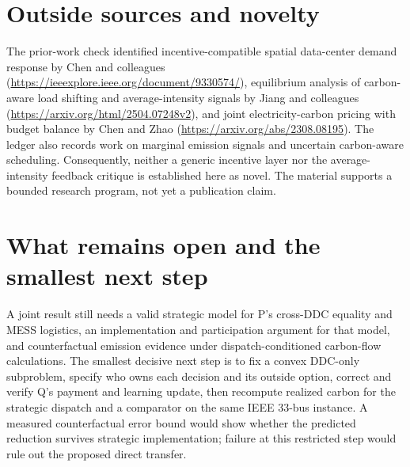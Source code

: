 \documentclass{article}
\begin{document}
\section*{Outside sources and novelty}

The prior-work check identified incentive-compatible spatial data-center demand response by Chen and colleagues (\url{https://ieeexplore.ieee.org/document/9330574/}), equilibrium analysis of carbon-aware load shifting and average-intensity signals by Jiang and colleagues (\url{https://arxiv.org/html/2504.07248v2}), and joint electricity-carbon pricing with budget balance by Chen and Zhao (\url{https://arxiv.org/abs/2308.08195}). The ledger also records work on marginal emission signals and uncertain carbon-aware scheduling. Consequently, neither a generic incentive layer nor the average-intensity feedback critique is established here as novel. The material supports a bounded research program, not yet a publication claim. 

\section*{What remains open and the smallest next step}

A joint result still needs a valid strategic model for P's cross-DDC equality and MESS logistics, an implementation and participation argument for that model, and counterfactual emission evidence under dispatch-conditioned carbon-flow calculations. The smallest decisive next step is to fix a convex DDC-only subproblem, specify who owns each decision and its outside option, correct and verify Q's payment and learning update, then recompute realized carbon for the strategic dispatch and a comparator on the same IEEE 33-bus instance. A measured counterfactual error bound would show whether the predicted reduction survives strategic implementation; failure at this restricted step would rule out the proposed direct transfer. 
\end{document}
